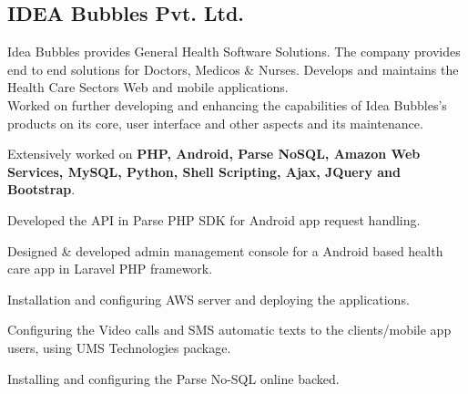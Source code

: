 \documentclass[11pt,a4paper,sans]{moderncv}        %
\begin{document}
\begin{center}
\subsection{IDEA Bubbles Pvt. Ltd.}
\newline{}
{\begin{changemargin}{2.5cm}{0.0cm} \vspace{-7ex} Idea Bubbles provides General Health Software Solutions. The company provides end to end solutions for Doctors, Medicos & Nurses.  Develops and maintains the Health Care Sectors Web and mobile applications.\newline{}\newline{}%
~\\
{\color{bluecolor}{\large Project Description}}\newline{}
Worked on further developing and enhancing the capabilities of Idea Bubbles's products on its core, user interface and other aspects and its maintenance.\newline{}\newline{}
{\color{bluecolor}{\large Responsibilities}}\end{changemargin}
\begin{cvitemize}%
\item Extensively worked on \textbf{ PHP, Android, Parse NoSQL, Amazon Web Services, MySQL, Python, Shell Scripting, Ajax, JQuery and Bootstrap}.
\item Developed the API in Parse PHP SDK for Android app request handling.
\item Designed & developed admin management console for a Android based health
care app in Laravel PHP framework. 
\item Installation and configuring AWS server and deploying the applications.
\item Configuring the Video calls and SMS automatic texts to the clients/mobile
app users, using UMS Technologies package.
\item Installing and configuring the Parse No-SQL online backed. 
\end{cvitemize}}

~\\



\end{center}
\end{document}
